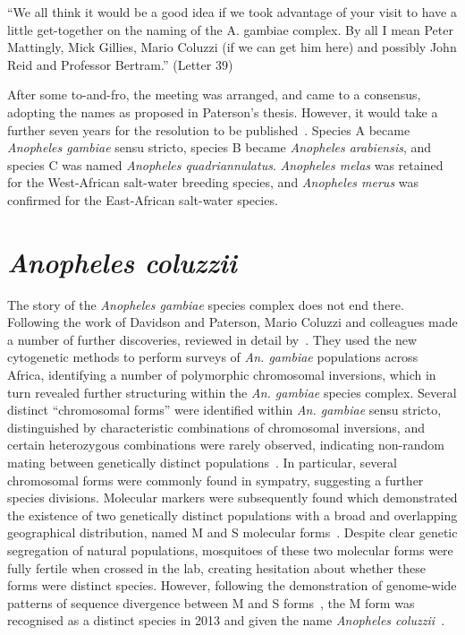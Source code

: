 \documentclass[a4paper,11pt,abstracton,hidelinks]{scrartcl}
\begin{document}
\begin{displayquote}
``We all think it would be a good idea if we took advantage of your visit to have a little get-together on the naming of the A. gambiae complex. By all I mean Peter Mattingly, Mick Gillies, Mario Coluzzi (if we can get him here) and possibly John Reid and Professor Bertram.'' (Letter 39)
\end{displayquote}


After some to-and-fro, the meeting was arranged, and came to a consensus, adopting the names as proposed in Paterson's thesis.
%
However, it would take a further seven years for the resolution to be published~\parencite{Mattingly1977}.
%
Species A became \textit{Anopheles gambiae} sensu stricto, species B became \textit{Anopheles arabiensis}, and species C was named \textit{Anopheles quadriannulatus}.
%
\textit{Anopheles melas} was retained for the West-African salt-water breeding species, and \textit{Anopheles merus} was confirmed for the East-African salt-water species.


\section{\textit{Anopheles coluzzii}}\label{sec:anopheles-coluzzii}


The story of the \textit{Anopheles gambiae} species complex does not end there. 
Following the work of Davidson and Paterson, Mario Coluzzi and colleagues made a number of further discoveries, reviewed in detail by~\textcite{Powell2014}.
%
They used the new cytogenetic methods to perform surveys of \textit{An. gambiae} populations across Africa, identifying a number of polymorphic chromosomal inversions, which in turn revealed further structuring within the \textit{An. gambiae} species complex.
%
Several distinct ``chromosomal forms'' were identified within \textit{An. gambiae} sensu stricto, distinguished by characteristic combinations of chromosomal inversions, and certain heterozygous combinations were rarely observed, indicating non-random mating between genetically distinct populations~\parencite{Toure1998,Coluzzi2002}.
%
In particular, several chromosomal forms were commonly found in sympatry, suggesting a further species divisions.
%
Molecular markers were subsequently found which demonstrated the existence of two genetically distinct populations with a broad and overlapping geographical distribution, named M and S molecular forms~\parencite{dellaTorre2001}.
%
Despite clear genetic segregation of natural populations, mosquitoes of these two molecular forms were fully fertile when crossed in the lab, creating hesitation about whether these forms were distinct species.
%
However, following the  demonstration of genome-wide patterns of sequence divergence between M and S forms~\parencite{Lawniczak2010}, the M form was recognised as a distinct species in 2013 and given the name \textit{Anopheles coluzzii}~\parencite{Coetzee2013}. 
\end{document}
